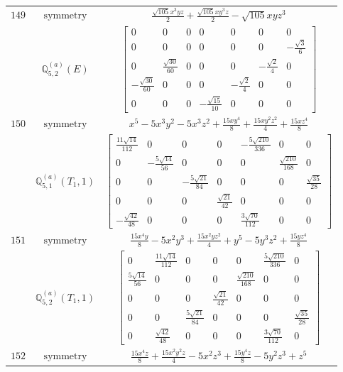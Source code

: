 \documentclass[fleqn,8pt,landscape]{jsarticle}
\begin{document}
\begin{longtable}{ccc}
$ 149 $ & $ \text{symmetry} $ & $ \frac{\sqrt{105} x^{3} y z}{2} + \frac{\sqrt{105} x y^{3} z}{2} - \sqrt{105} x y z^{3} $ \\
$  $ & $ \mathbb{Q}_{5,2}^{(a)}(E) $ & $ \begin{bmatrix} 0 & 0 & 0 & 0 & 0 & 0 & 0 \\ 0 & 0 & 0 & 0 & 0 & 0 & - \frac{\sqrt{3}}{6} \\ 0 & \frac{\sqrt{30}}{60} & 0 & 0 & 0 & - \frac{\sqrt{2}}{4} & 0 \\ - \frac{\sqrt{30}}{60} & 0 & 0 & 0 & - \frac{\sqrt{2}}{4} & 0 & 0 \\ 0 & 0 & 0 & - \frac{\sqrt{15}}{10} & 0 & 0 & 0 \end{bmatrix} $ \\ \hline
$ 150 $ & $ \text{symmetry} $ & $ x^{5} - 5 x^{3} y^{2} - 5 x^{3} z^{2} + \frac{15 x y^{4}}{8} + \frac{15 x y^{2} z^{2}}{4} + \frac{15 x z^{4}}{8} $ \\
$  $ & $ \mathbb{Q}_{5,1}^{(a)}(T_{1},1) $ & $ \begin{bmatrix} \frac{11 \sqrt{14}}{112} & 0 & 0 & 0 & - \frac{5 \sqrt{210}}{336} & 0 & 0 \\ 0 & - \frac{5 \sqrt{14}}{56} & 0 & 0 & 0 & \frac{\sqrt{210}}{168} & 0 \\ 0 & 0 & - \frac{5 \sqrt{21}}{84} & 0 & 0 & 0 & \frac{\sqrt{35}}{28} \\ 0 & 0 & 0 & \frac{\sqrt{21}}{42} & 0 & 0 & 0 \\ - \frac{\sqrt{42}}{48} & 0 & 0 & 0 & \frac{3 \sqrt{70}}{112} & 0 & 0 \end{bmatrix} $ \\ \hline
$ 151 $ & $ \text{symmetry} $ & $ \frac{15 x^{4} y}{8} - 5 x^{2} y^{3} + \frac{15 x^{2} y z^{2}}{4} + y^{5} - 5 y^{3} z^{2} + \frac{15 y z^{4}}{8} $ \\
$  $ & $ \mathbb{Q}_{5,2}^{(a)}(T_{1},1) $ & $ \begin{bmatrix} 0 & \frac{11 \sqrt{14}}{112} & 0 & 0 & 0 & \frac{5 \sqrt{210}}{336} & 0 \\ \frac{5 \sqrt{14}}{56} & 0 & 0 & 0 & \frac{\sqrt{210}}{168} & 0 & 0 \\ 0 & 0 & 0 & \frac{\sqrt{21}}{42} & 0 & 0 & 0 \\ 0 & 0 & \frac{5 \sqrt{21}}{84} & 0 & 0 & 0 & \frac{\sqrt{35}}{28} \\ 0 & \frac{\sqrt{42}}{48} & 0 & 0 & 0 & \frac{3 \sqrt{70}}{112} & 0 \end{bmatrix} $ \\ \hline
$ 152 $ & $ \text{symmetry} $ & $ \frac{15 x^{4} z}{8} + \frac{15 x^{2} y^{2} z}{4} - 5 x^{2} z^{3} + \frac{15 y^{4} z}{8} - 5 y^{2} z^{3} + z^{5} $ \\

\end{longtable}
\end{document}
